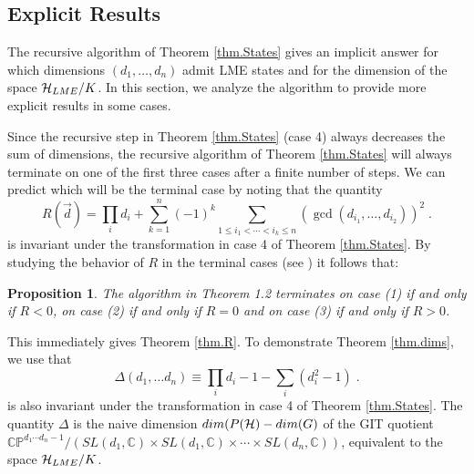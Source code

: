 \documentclass[12pt]{article}
\newtheorem{proposition}[theorem]{Proposition}
\theoremstyle{definition}
\newcommand{\be}{\begin{equation}}
\newcommand{\ee}{\end{equation}}
\begin{document}
\subsection{Explicit Results}

The recursive algorithm of Theorem \ref{thm.States} gives an implicit answer for which dimensions $(d_1, \dots, d_n)$ admit LME states and for the dimension of the space ${\cal H}_{LME}/K$. In this section, we analyze the algorithm to provide more explicit results in some cases.

Since the recursive step in Theorem \ref{thm.States} (case 4) always decreases the sum of dimensions, the recursive algorithm of Theorem \ref{thm.States} will always terminate on one of the first three cases after a finite number of steps. We can predict which will be the terminal case by noting that 
the quantity 
\be
R(\vec{d}) = \prod_i d_i + \sum_{k=1}^n (-1)^k \sum_{1 \le i_1 < \cdots < i_k \le n} (\gcd(d_{i_1},\dots,d_{i_2}))^2 \; .
\ee
is invariant under the transformation in case 4 of Theorem \ref{thm.States}. By studying the behavior of $R$ in the terminal cases (see \cite{mathpaper}) it follows that:
\begin{proposition}\label{prop:Rcases}
The algorithm in Theorem 1.2 terminates on case (1) if and only if $R<0$, on case (2) if and only if $R=0$ and on case (3) if and only if $R>0$.
\end{proposition}
This immediately gives Theorem \ref{thm.R}. To demonstrate Theorem \ref{thm.dims}, we use that 
\be
\label{defDelta}
\Delta(d_1, \dots d_n) \equiv \prod_i d_i - 1 - \sum_i (d_i^2 - 1)   \; .
\ee
is also invariant under the transformation in case 4 of Theorem \ref{thm.States}. The quantity $\Delta$ is the naive dimension $dim(P({\cal H}) - dim(G)$ of the GIT quotient $\mathbb{CP}^{d_1 \cdots d_n - 1}/(SL(d_1, \mathbb{C}) \times SL(d_1, \mathbb{C}) \times \cdots \times SL(d_n, \mathbb{C}))$, equivalent to the space ${\cal H}_{LME}/K$.
\end{document}
